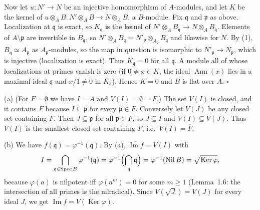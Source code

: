 \documentclass[11pt]{article}
\begin{document}
Now let $u:N'\to N$ be an injective homomorphism of $A$-modules, and let $K$ be the kernel of $u\otimes_A B:N'\otimes_AB\to N\otimes_AB$, a $B$-module. Fix $\mathfrak{q}$ and $\mathfrak{p}$ as above. Localization at $\mathfrak{q}$ is exact, so $K_{\mathfrak{q}}$ is the kernel of $N'\otimes_AB_{\mathfrak{q}}\to N\otimes_AB_{\mathfrak{q}}$. Elements of $A\setminus\mathfrak{p}$ are invertible in $B_{\mathfrak{q}}$, so $N'\otimes_AB_{\mathfrak{q}}=N'_{\mathfrak{p}}\otimes_{A_{\mathfrak{p}}}B_{\mathfrak{q}}$ and likewise for $N$. By (1), $B_{\mathfrak{q}}\simeq A_{\mathfrak{p}}$ as $A_{\mathfrak{p}}$-modules, so the map in question is isomorphic to $N'_{\mathfrak{p}}\to N_{\mathfrak{p}}$, which is injective (localization is exact). Thus $K_{\mathfrak{q}}=0$ for all $\mathfrak{q}$. A module all of whose localizations at primes vanish is zero (if $0\neq x\in K$, the ideal $\operatorname{Ann}(x)$ lies in a maximal ideal $\mathfrak{q}$ and $x/1\neq0$ in $K_{\mathfrak{q}}$). Hence $K=0$ and $B$ is flat over $A$. \hfill$\square$

\pf
(a) (For $F=\emptyset$ we have $I=A$ and $V(I)=\emptyset=\overline F$.) The set $V(I)$ is closed, and it contains $F$ because $I\subseteq\mathfrak{p}$ for every $\mathfrak{p}\in F$. Conversely let $V(J)$ be any closed set containing $F$. Then $J\subseteq\mathfrak{p}$ for all $\mathfrak{p}\in F$, so $J\subseteq I$ and $V(I)\subseteq V(J)$. Thus $V(I)$ is the smallest closed set containing $F$, i.e.\ $V(I)=\overline F$.

(b) We have $f(\mathfrak{q})=\varphi^{-1}(\mathfrak{q})$. By (a), $\overline{\operatorname{Im}f}=V(I)$ with
\[ I=\bigcap_{\mathfrak{q}\in\operatorname{Spec}B}\varphi^{-1}(\mathfrak{q})=\varphi^{-1}\Bigl(\bigcap_{\mathfrak{q}}\mathfrak{q}\Bigr)=\varphi^{-1}(\operatorname{Nil}B)=\sqrt{\operatorname{Ker}\varphi}, \]
because $\varphi(a)$ is nilpotent iff $\varphi(a^m)=0$ for some $m\geq1$ (Lemma~1.6: the intersection of all primes is the nilradical). Since $V(\sqrt J)=V(J)$ for every ideal $J$, we get $\overline{\operatorname{Im}f}=V(\operatorname{Ker}\varphi)$.
\end{document}
